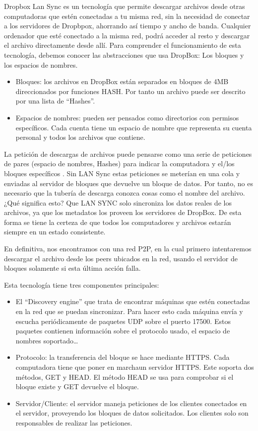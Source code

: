 \begin{enumerate}
Dropbox Lan Sync es un tecnología que permite descargar archivos desde otras computadoras que estén conectadas a tu misma red, sin la necesidad de conectar a los servidores de Dropbpox, ahorrando así tiempo y ancho de banda. Cualquier ordenador que esté conectado a la misma red, podrá acceder al resto y descargar el archivo directamente desde allí.
Para comprender el funcionamiento de esta tecnología, debemos conocer las abstracciones que usa DropBox: Los bloques y los espacios de nombres. 
\begin{itemize}
	\item Bloques: los archivos en DropBox están separados en bloques de 4MB direccionados por funciones HASH. Por tanto un archivo puede ser descrito por una lista de “Hashes”.
	\item Espacios de nombres:   pueden ser pensados como directorios con permisos específicos. Cada cuenta tiene un espacio de nombre que representa su cuenta personal  y todos los archivos que contiene. 
\end{itemize}



La petición de descargas de archivos puede pensarse como una serie de peticiones de pares (espacio de nombres, Hashes) para indicar  la computadora y el/los bloques específicos . Sin LAN Sync estas peticiones se meterían en una cola  y enviadas al servidor de bloques que devuelve un bloque de datos. Por tanto, no es necesario que la tubería de descarga conozca cosas como el nombre del archivo. ¿Qué significa esto? Que  LAN SYNC solo sincroniza los datos reales de los archivos, ya que los metadatos los proveen los servidores de DropBox. De esta forma se tiene la certeza de que todos los computadores y archivos estarán siempre en un estado consistente.


En definitiva, nos encontramos con una red P2P, en la cual primero intentaremos descargar el archivo desde los peers ubicados en la red, usando el servidor de bloques solamente si esta última acción falla.

Esta tecnología tiene tres componentes principales:
\begin{itemize}
\item El “Discovery engine” que trata de encontrar máquinas que estén conectadas en la red que se puedan sincronizar. Para hacer esto cada máquina envía y escucha periódicamente de paquetes UDP sobre el puerto 17500. Estos paquetes contienen información sobre el protocolo usado, el espacio de nombres soportado…
\item Protocolo:  la transferencia del bloque se hace mediante HTTPS. Cada computadora tiene que poner en marchaun servidor HTTPS. Este soporta dos métodos, GET y HEAD. El método HEAD se usa para comprobar si el bloque existe y GET devuelve el bloque.
\item Servidor/Cliente: el servidor maneja peticiones de los clientes conectados en el servidor, proveyendo los bloques de datos solicitados. Los clientes solo son responsables de realizar las peticiones.  
\end{itemize}
\end{enumerate}

